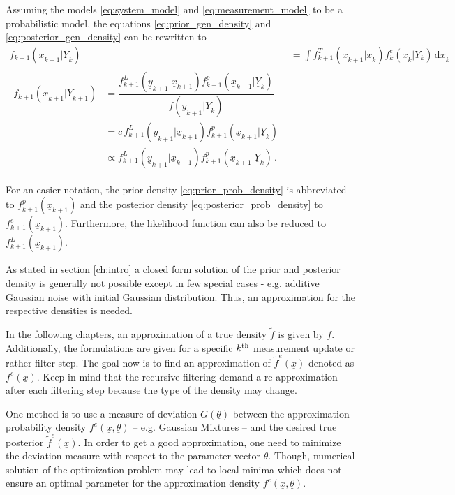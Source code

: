 \documentclass[a4paper]{IEEEtran}
\begin{document}
Assuming the models \eqref{eq:system_model} and \eqref{eq:measurement_model} to be a probabilistic model, the equations \eqref{eq:prior_gen_density} and \eqref{eq:posterior_gen_density}
can be rewritten to
\begin{align}
    f_{k+1}(\underline{x}_{k+1} \vert  \underline{Y}_{k}) &= \int f^{T}_{k+1}(\underline{x}_{k+1} \vert \underline{x}_{k})f^{e}_{k}(\underline{x}_{k} \vert Y_{k})\, \mathrm{d} \underline{x}_{k} \label{eq:prior_prob_density} \\
    \begin{split}
        f_{k+1}(\underline{x}_{k+1} \vert \underline{Y}_{k+1})  &=  \dfrac{f^{L}_{k+1}(\underline{y}_{k+1} \vert \underline{x}_{k+1}) f^{p}_{k+1}(\underline{x}_{k+1} \vert \underline{Y}_{k})}{f(\underline{y}_{k+1} \vert \underline{Y}_{k})} \\
        &= c \, f^{L}_{k+1}(\underline{y}_{k+1} \vert \underline{x}_{k+1}) f^{p}_{k+1}(\underline{x}_{k+1} \vert \underline{Y}_{k}) \\
        &\propto  f^{L}_{k+1}(\underline{y}_{k+1} \vert \underline{x}_{k+1}) f^{p}_{k+1}(\underline{x}_{k+1} \vert \underline{Y}_{k})    \,. \label{eq:posterior_prob_density}
    \end{split}
\end{align}  
  
For an easier notation, the prior density \eqref{eq:prior_prob_density} is abbreviated to $f^{p}_{k+1}(\underline{x}_{k+1})$ and the posterior density \eqref{eq:posterior_prob_density} to $f^e_{k+1}(\underline{x}_{k+1})$. 
Furthermore, the likelihood function can also be reduced to $f^{L}_{k+1}(\underline{x}_{k+1})$.

As stated in section \ref{ch:intro} a closed form solution of the prior and posterior density is generally not possible except in few special cases - e.g. additive Gaussian noise with initial Gaussian distribution. Thus, an approximation for the 
respective densities is needed. 

In the following chapters, an approximation of a true density $\tilde{f}$ is given by $f$. Additionally, the formulations are given for a specific $k \textsuperscript{th}$ measurement update or rather filter step. The goal now is to find an approximation of $\tilde{f}^e(\underline{x})$ 
denoted as $f^e(\underline{x})$. Keep in mind that the recursive filtering demand a re-approximation after each filtering step because the type of the density may change. 

One method is to use a measure of deviation $G(\underline{\theta})$ between the approximation probability density 
$f^e(\underline{x}, \underline{\theta})$ -- e.g. Gaussian Mixtures -- and the desired true posterior $\tilde{f}^{e}(\underline{x})$. In order to get a good approximation, one need to minimize the deviation measure with respect to the 
parameter vector $\underline{\theta}$. Though, numerical solution of the optimization problem may lead to local minima which does not ensure an optimal parameter for the 
approximation density $f^e(\underline{x}, \underline{\theta})$. 
\end{document}

